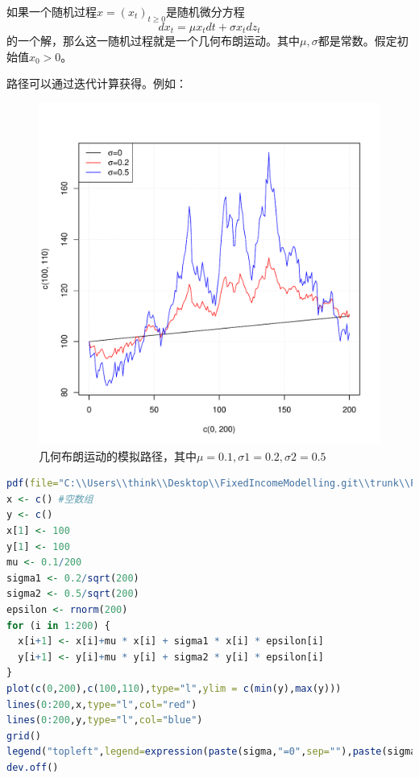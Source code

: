 \documentclass[UTF8]{ctexart}
\begin{document}
如果一个随机过程$x=(x_t)_{t \geqslant 0}$是随机微分方程$$dx_t=\mu x_t dt + \sigma x_t dz_t$$的一个解，那么这一随机过程就是一个几何布朗运动。其中$\mu,\sigma$都是常数。假定初始值$x_0>0$。

路径可以通过迭代计算获得。例如：
\begin{figure}[H]
    \centering
    \includegraphics[scale=0.6]{P51.pdf}
    \caption*{几何布朗运动的模拟路径，其中$\mu=0.1,\sigma 1=0.2,\sigma 2=0.5$}
\end{figure}
\begin{lstlisting}[language=R]  
pdf(file="C:\\Users\\think\\Desktop\\FixedIncomeModelling.git\\trunk\\P51.pdf")
x <- c() #空数组
y <- c()
x[1] <- 100
y[1] <- 100
mu <- 0.1/200
sigma1 <- 0.2/sqrt(200)
sigma2 <- 0.5/sqrt(200)
epsilon <- rnorm(200)
for (i in 1:200) {
  x[i+1] <- x[i]+mu * x[i] + sigma1 * x[i] * epsilon[i]
  y[i+1] <- y[i]+mu * y[i] + sigma2 * y[i] * epsilon[i]
}
plot(c(0,200),c(100,110),type="l",ylim = c(min(y),max(y)))
lines(0:200,x,type="l",col="red")
lines(0:200,y,type="l",col="blue")
grid()
legend("topleft",legend=expression(paste(sigma,"=0",sep=""),paste(sigma,"=0.2",sep=""),paste(sigma,"=0.5",sep="")),lty=1,col=c("black","red","blue"))
dev.off()
\end{lstlisting}
\end{document}
